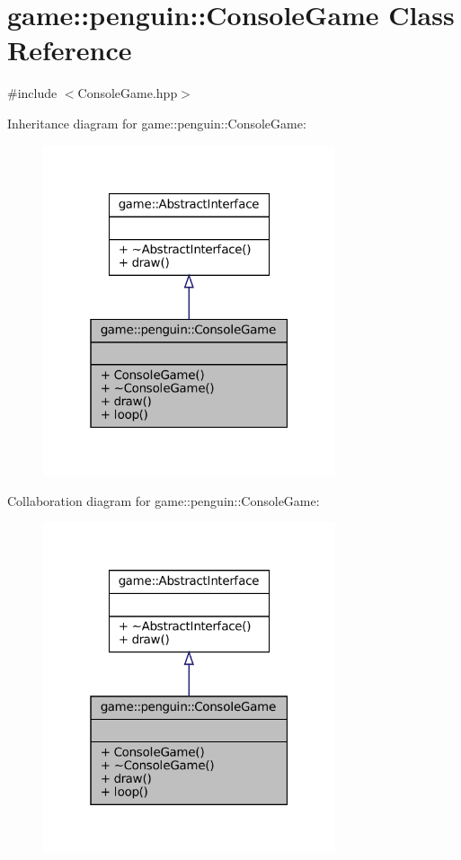 \hypertarget{classgame_1_1penguin_1_1_console_game}{}\section{game\+:\+:penguin\+:\+:Console\+Game Class Reference}
\label{classgame_1_1penguin_1_1_console_game}


{\ttfamily \#include $<$Console\+Game.\+hpp$>$}



Inheritance diagram for game\+:\+:penguin\+:\+:Console\+Game\+:
\nopagebreak
\begin{figure}[H]
\begin{center}
\leavevmode
\includegraphics[width=244pt]{classgame_1_1penguin_1_1_console_game__inherit__graph}
\end{center}
\end{figure}


Collaboration diagram for game\+:\+:penguin\+:\+:Console\+Game\+:
\nopagebreak
\begin{figure}[H]
\begin{center}
\leavevmode
\includegraphics[width=244pt]{classgame_1_1penguin_1_1_console_game__coll__graph}
\end{center}
\end{figure}
